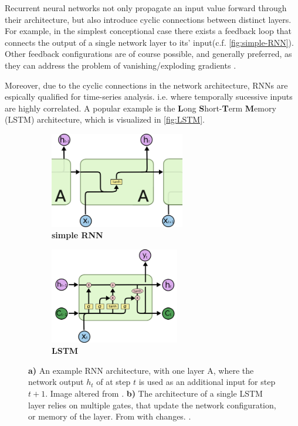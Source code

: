 Recurrent neural networks not only propagate an input value forward through their architecture, but also introduce cyclic connections between distinct layers. For
example, in the simplest conceptional case there exists a feedback loop that connects the output of a single network layer to its' input(c.f. 
\autoref{fig:simple-RNN}). Other feedback configurations are of course possible, and generally preferred, as they can address the problem of vanishing/exploding 
gradients \cite{hochreiter1991untersuchungen}. 

Moreover, due to the cyclic connections in the network architecture, RNNs are espically qualified for time-series analysis. i.e. where temporally sucessive inputs
are highly correlated. A popular example is the \textbf{L}ong \textbf{S}hort-\textbf{T}erm \textbf{M}emory (LSTM) architecture, which is visualized in 
\autoref{fig:LSTM}.

\begin{figure}
	\centering
	\begin{subfigure}[h]{0.45\linewidth}
	\includegraphics[height=4.2cm]{imgs/simple_RNN.png}
	\caption{\textbf{simple RNN}\label{fig:simple-RNN}}
	\end{subfigure}
	\begin{subfigure}[h]{0.45\linewidth}
	\includegraphics[height=4.2cm]{imgs/LSTM.png}
	\caption{\textbf{LSTM}\label{fig:LSTM}}
	\end{subfigure}
	\caption*{\textbf{a)} An example RNN architecture, with one layer A, where the network output $h_t$ of at step $t$ is used as an additional input for step $t+1$. 
	Image altered from \cite{NN-images}. \textbf{b)} The architecture of a single LSTM layer relies on multiple gates, that update the network configuration, or 
	memory of the layer. From \cite{NN-images} with changes. \label{fig:NN-architectures}.}
\end{figure}

